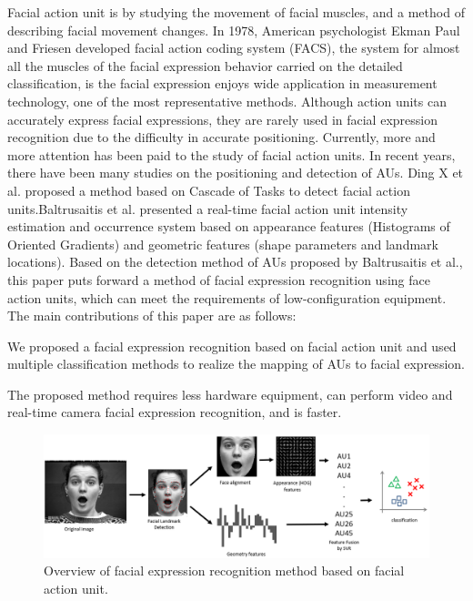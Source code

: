 \documentclass[10pt, conference, compsocconf]{IEEEtran}
\begin{document}
Facial action unit is by studying the movement of facial muscles\cite{Hager1985A}, and a method of describing facial movement changes. In 1978, American psychologist Ekman Paul and Friesen\cite{friesen1978facial} developed facial action coding system (FACS), the system for almost all the muscles of the facial expression behavior carried on the detailed classification, is the facial expression enjoys wide application in measurement technology, one of the most representative methods. Although action units can accurately express facial expressions, they are rarely used in facial expression recognition due to the difficulty in accurate positioning. Currently, more and more attention has been paid to the study of facial action units. In recent years, there have been many studies on the positioning and detection of AUs. Ding X\cite{Ding2013Facial} et al. proposed a method based on Cascade of Tasks to detect facial action units.Baltrusaitis\cite{Baltrusaitis2015Cross} et al. presented a real-time facial action unit intensity estimation and occurrence system based on appearance features (Histograms of Oriented Gradients) and geometric features (shape parameters and landmark locations). Based on the detection method of AUs proposed by Baltrusaitis et al., this paper puts forward a method of facial expression recognition using face action units, which can meet the requirements of low-configuration equipment. The main contributions of this paper are as follows:

We proposed a facial expression recognition based on facial action unit and used multiple classification methods to realize the mapping of AUs to facial expression.

The proposed method requires less hardware equipment, can perform video and real-time camera facial expression recognition, and is faster.

\begin{figure}[h]
	\centering
	\includegraphics[width=\textwidth]{framework}
	\caption{Overview of facial expression recognition method based on facial action unit.}
\end{figure}
\end{document}

